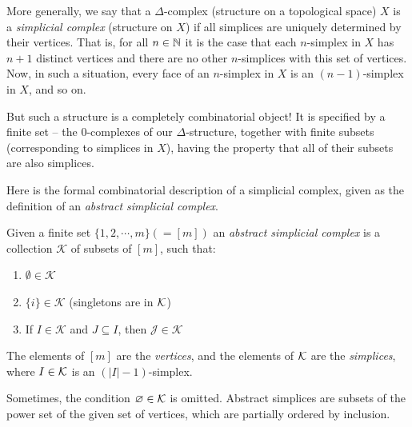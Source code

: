 \documentclass[11pt,a4paper]{report}
\begin{document}
	  More generally, we say that a $\Delta$-complex (structure on a topological space) $X$ is a \emph{simplicial complex} (structure on $X$) if all  simplices are
	  uniquely determined by their vertices. That is, for all $n\in \mathbb{N}$ it is the case that each $n$-simplex in $X$ has $n+1$ 
	  distinct vertices and there are no other $n$-simplices with this set of vertices. 
	  Now, in such a situation, every face of an $n$-simplex in $X$ is an $(n-1)$-simplex in $X$, and so on. 
	  
	  But 
	  such a structure is  a  completely combinatorial object! It is specified by a finite set -- the $0$-complexes of our $\Delta$-structure,
	  together with finite subsets (corresponding to simplices in $X$), having the property that all of their subsets are also simplices.
	  
	  
	  
	  
	   Here is the formal combinatorial description of a simplicial complex, given as the definition of an \emph{abstract simplicial complex}. 


		     
		     
		     \begin{defn}  
              Given a finite  set $  \{1, 2, \cdots, m\} (=[m])$ 
              an \emph{ abstract simplicial complex} is a collection $\mathcal{K}$ of subsets of $[m]$,  such that:
              \begin{enumerate}
              \item $\emptyset \in \mathcal{K}$
              \item $\{i\} \in \mathcal{K}$ (singletons are in $\mathcal{K}$)
              \item If $ I \in \mathcal{K} $ and $J\subseteq I$, then $\mathcal{J} \in \mathcal{K}$
              \end{enumerate}
              The elements of $[m]$ are the \emph{vertices}, and the elements of $\mathcal{K}$ are the \emph{simplices}, where $I\in \mathcal{K}$ is
              an $(|I|-1)$-simplex.
		     \end{defn}
		     Sometimes, the condition $\varnothing\in \mathcal{K}$ is omitted. Abstract simplices are subsets of the power set of the given set of vertices, 
		     which are partially ordered by inclusion.
\end{document}
